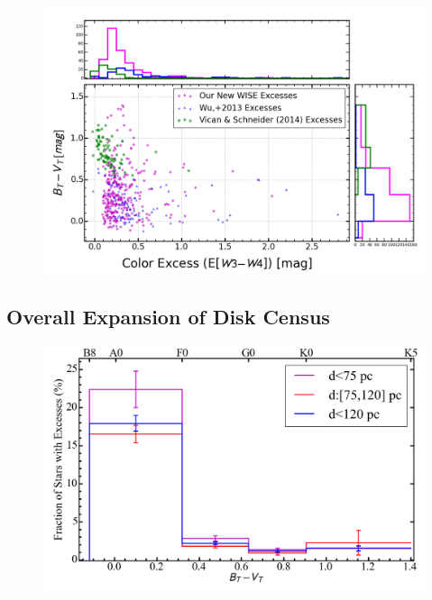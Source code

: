     \begin{figure}
    \centering
    \includegraphics[width=\textwidth]{Ch5/wise_vs_wu_120pc}
    \caption[My WISE Disks vs. Other WISE Disks]{}
    \label{fig:wise_v_wise}
    \end{figure}
    
    
    

    
    
    \subsection{Overall Expansion of Disk Census}

    \begin{figure}
    \centering
    \includegraphics[width=\textwidth]{Ch5/incidencerates_120pc}
    \caption[Incidence of Excesses]{}
    \label{fig:incidence_rates}
    \end{figure}
    
